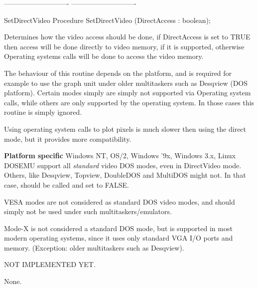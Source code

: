 ----------------------------
----------------------------
\begin{procedure}{SetDirectVideo}
\Declaration
Procedure SetDirectVideo (DirectAccess : boolean);

\Description
Determines how the video access should be done, if DirectAccess
is set to TRUE then access will be done directly to video memory, if
it is supported, otherwise Operating systems calls will be done to
access the video memory.

The behaviour of this routine depends on the platform, and is required
for example to use the graph unit under older multitaskers such as
Desqview (DOS platform). Certain modes simply are simply not supported
via Operating system calls, while others are only supported by the
operating system. In those cases this routine is simply ignored.

Using operating system calls to plot pixels is much slower then using
the direct mode, but it provides more compatibility.

\textbf{Platform specific}
Windows NT, OS/2, Windows '9x, Windows 3.x, Linux DOSEMU support
all \textit{standard} video DOS modes, even in DirectVideo mode.
Others, like Desqview, Topview, DoubleDOS and MultiDOS might not.
In that case,  should be called and set to FALSE.

VESA modes are not considered as standard DOS video modes,
and should simply not be used under such multitaskers/emulators.

Mode-X is not considered a standard DOS mode, but is supported in
most modern operating systems, since it uses only standard VGA
I/O ports and memory. (Exception: older multitaskers such as Desqview).

NOT IMPLEMENTED YET.


\Errors
None.
\SeeAlso
{}
\end{procedure}

